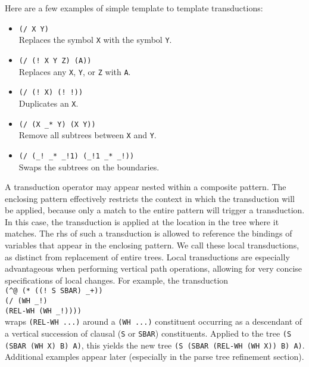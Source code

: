 \documentclass[a4,11pt]{article}
\begin{document}
Here are a few examples of simple template to template transductions:
\begin {itemize}
\item  \texttt{(/ X Y)}\\Replaces the symbol \texttt{X} with the symbol \texttt{Y}.
\item  \texttt{(/ (! X Y Z) (A))}\\Replaces any \texttt{X}, \texttt{Y}, or \texttt{Z} with \texttt{A}.
\item  \texttt{(/ (! X) (! !))}\\Duplicates an \texttt{X}.
\item  \texttt{(/ (X \_* Y) (X Y))}\\Remove all subtrees between \texttt{X} and \texttt{Y}.
\item  \texttt{(/ (\_! \_* \_!1) (\_!1 \_* \_!))}\\Swaps the subtrees on the boundaries.
\end {itemize}

A transduction operator may appear nested within a composite pattern.  The enclosing pattern effectively restricts the context in which the transduction will be applied, because only a match to the entire pattern will trigger a transduction.   In this case, the transduction is applied at the location in the tree where it matches.  The rhs of such a transduction is allowed to reference the bindings of variables that appear in the enclosing pattern. We call these local transductions, as distinct from replacement of entire trees.  Local transductions are especially advantageous when performing vertical path operations, allowing for very concise specifications of local changes. For example,  the transduction\\
\hspace*{1em} \texttt{(\^{}@ (* ((! S SBAR) \_+))}\\
\hspace*{3.4em} \texttt{(/ (WH \_!)}\\
\hspace*{5.2em} \texttt{(REL-WH (WH \_!))))}\\
wraps \texttt{(REL-WH ...)} around a \texttt{(WH ...)} constituent occurring as a descendant of a vertical succession of clausal (\texttt{S} or \texttt{SBAR}) constituents. Applied to the tree \texttt{(S (SBAR (WH X) B) A)}, this yields the new tree \texttt{(S (SBAR (REL-WH (WH X)) B) A)}.  Additional examples appear later (especially in the parse tree refinement section). 
\end{document}
